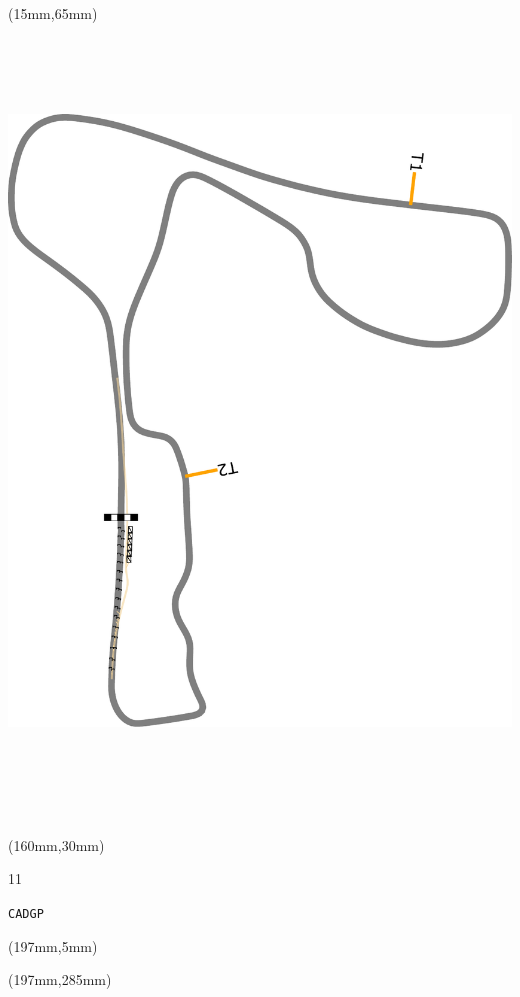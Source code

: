 \begin{textblock*}{185mm}(15mm,65mm)%
\centering
\mbox{\includegraphics[width=185mm,height=210mm,keepaspectratio]{PT/CADGP.pdf}}
\end{textblock*}
\begin{textblock*}{40mm}(160mm,30mm)%
\Large
\par{} 
\par11 
\par\hfill\tiny\tt CADGP\\
\end{textblock*}
\begin{textblock*}{20mm}(197mm,5mm)%
\fbox{\thepage}
\label{CADGP}
\end{textblock*}
\begin{textblock*}{20mm}(197mm,285mm)%
\fbox{\thepage}
\end{textblock*}

